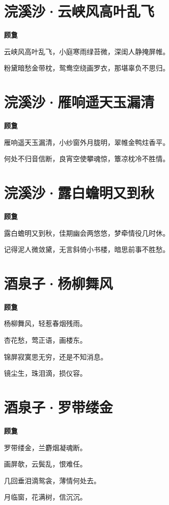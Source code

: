 \documentclass[12pt,a4paper]{ctexbook}
\begin{document}
\section{浣溪沙·云峡风高叶乱飞}
\textbf{顾敻}\par\vspace{0.5em}
云峡风高叶乱飞，小庭寒雨绿苔微，深闺人静掩屏帷。\par
粉黛暗愁金带枕，鸳鸯空绕画罗衣，那堪辜负不思归。\par

\section{浣溪沙·雁响遥天玉漏清}
\textbf{顾敻}\par\vspace{0.5em}
雁响遥天玉漏清，小纱窗外月胧明，翠帷金鸭炷香平。\par
何处不归音信断，良宵空使攀魂惊，簟凉枕冷不胜情。\par

\section{浣溪沙·露白蟾明又到秋}
\textbf{顾敻}\par\vspace{0.5em}
露白蟾明又到秋，佳期幽会两悠悠，梦牵情役几时休。\par
记得泥人微敛黛，无言斜倚小书楼，暗思前事不胜愁。\par

\section{酒泉子·杨柳舞风}
\textbf{顾敻}\par\vspace{0.5em}
杨柳舞风，轻惹春烟残雨。\par
杏花愁，莺正语，画楼东。\par
锦屏寂寞思无穷，还是不知消息。\par
镜尘生，珠泪滴，损仪容。\par

\section{酒泉子·罗带缕金}
\textbf{顾敻}\par\vspace{0.5em}
罗带缕金，兰麝烟凝魂断。\par
画屏欹，云鬓乱，恨难任。\par
几回垂泪滴鸳衾，薄情何处去。\par
月临窗，花满树，信沉沉。\par
\end{document}
